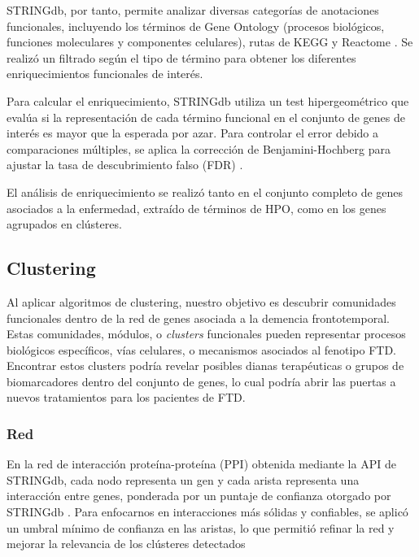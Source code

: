 STRINGdb, por tanto, permite analizar diversas categorías de anotaciones funcionales, incluyendo los términos de Gene Ontology (procesos biológicos, funciones moleculares y componentes celulares), rutas de KEGG y Reactome \cite{Szklarczyk2023}. Se realizó un filtrado según el tipo de término para obtener los diferentes enriquecimientos funcionales de interés.

Para calcular el enriquecimiento, STRINGdb utiliza un test hipergeométrico que evalúa si la representación de cada término funcional en el conjunto de genes de interés es mayor que la esperada por azar. Para controlar el error debido a comparaciones múltiples, se aplica la corrección de Benjamini-Hochberg para ajustar la tasa de descubrimiento falso (FDR) \cite{Szklarczyk2023}.

El análisis de enriquecimiento se realizó tanto en el conjunto completo de genes asociados a la enfermedad, extraído de términos de HPO, como en los genes agrupados en clústeres. 


\subsection{Clustering}

Al aplicar algoritmos de clustering, nuestro objetivo es descubrir comunidades funcionales dentro de la red de genes asociada a la demencia frontotemporal. Estas comunidades, módulos, o \textit{clusters} funcionales pueden representar procesos biológicos específicos, vías celulares, o mecanismos asociados al fenotipo FTD. Encontrar estos clusters podría revelar posibles dianas terapéuticas o grupos de biomarcadores dentro del conjunto de genes, lo cual podría abrir las puertas a nuevos tratamientos para los pacientes de FTD.

\subsubsection*{Red}

En la red de interacción proteína-proteína (PPI) obtenida mediante la API de STRINGdb, cada nodo representa un gen y cada arista representa una interacción entre genes, ponderada por un puntaje de confianza otorgado por STRINGdb \cite{szklarczyk2023stringdb}. Para enfocarnos en interacciones más sólidas y confiables, se aplicó un umbral mínimo de confianza en las aristas, lo que permitió refinar la red y mejorar la relevancia de los clústeres detectados 


